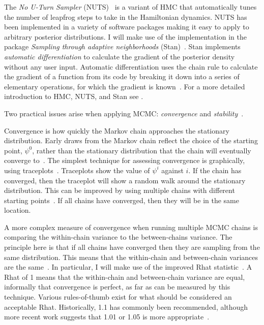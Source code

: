 \documentclass[thesis.tex]{subfiles}
\begin{document}
The \emph{No U-Turn Sampler} (NUTS)~\autocite{hoffmanNUTS} is a variant of HMC that automatically tunes the number of leapfrog steps to take in the Hamiltonian dynamics.
NUTS has been implemented in a variety of software packages making it easy to apply to arbitrary posterior distributions.
I will make use of the implementation in the package \emph{Sampling through adaptive neighborhoods} (Stan)~\autocite{Stan-2-32-2}.
Stan implements \emph{automatic differentiation} to calculate the gradient of the posterior density without any user input.
Automatic differentiation uses the chain rule to calculate the gradient of a function from its code by breaking it down into a series of elementary operations, for which the gradient is known~\autocite{autodiff}.
For a more detailed introduction to HMC, NUTS, and Stan see \textcite[chapter 12]{gelmanBDA}.

Two practical issues arise when applying MCMC: \emph{convergence} and \emph{stability}~\autocite[72]{lunnBUGS}.

Convergence is how quickly the Markov chain approaches the stationary distribution.
Early draws from the Markov chain reflect the choice of the starting point, $\psi^0$, rather than the stationary distribution that the chain will eventually converge to~\autocite[282]{gelmanBDA}.
The simplest technique for assessing convergence is graphically, using traceplots~\autocite[81]{brooksMCMCNotes}.
Traceplots show the value of $\psi^i$ against $i$.
If the chain has converged, then the traceplot will show a random walk around the stationary distribution.
This can be improved by using multiple chains with different starting points~\autocite[283]{gelmanBDA}.
If all chains have converged, then they will be in the same location.

A more complex measure of convergence when running multiple MCMC chains is comparing the within-chain variance to the between-chains variance.
The principle here is that if all chains have converged then they are sampling from the same distribution.
This means that the within-chain and between-chain variances are the same~\autocite[82]{brooksMCMCNotes}.
In particular, I will make use of the improved Rhat statistic~\autocite{vehtariRhat}.
A Rhat of 1 means that the within-chain and between-chain variance are equal, informally that convergence is perfect, as far as can be measured by this technique.
Various rules-of-thumb exist for what should be considered an acceptable Rhat.
Historically, 1.1 has commonly been recommended, although more recent work suggests that 1.01 or 1.05 is more appropriate~\autocite{vehtariRhat}.
\end{document}
